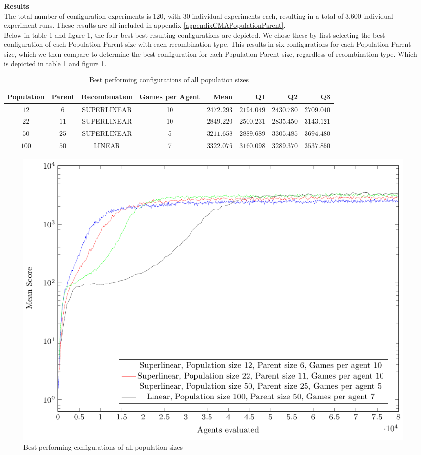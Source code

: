 \textbf{Results}\\
The total number of configuration experiments is 120, with 30 individual experiments each,
resulting in a total of 3.600 individual experiment runs. These results are all included in 
appendix \ref{appendixCMAPopulationParent}.\\
Below in table \ref{CMABestConfigTable} and figure \ref{CMABestConfigPlot}, the four best
best resulting configurations are depicted. We chose these by first selecting the best 
configuration of each Population-Parent size with each recombination type. This results in six
configurations for each Population-Parent size, which we then compare to determine the best
configuration for each Population-Parent size, regardless of recombination type. Which is depicted in table \ref{CMABestConfigTable} and figure \ref{CMABestConfigPlot}.

\begin{table}[H]
\centering
\small
\begin{tabular}{c c c c r r r r}
Population & Parent & Recombination & Games per Agent & Mean & Q1 & Q2 & Q3\\
\hline
$12$ & $6$  & SUPERLINEAR & 10 & $2472.293$ & $2194.049$ & $2430.780$ & $2709.040$\\
$22$ & $11$ & SUPERLINEAR & 10 & $2849.220$ & $2500.231$ & $2835.450$ & $3143.121$\\
$50$ & $25$ & SUPERLINEAR & 5  & $3211.658$ & $2889.689$ & $3305.485$ & $3694.480$\\
$100$ & $50$ & LINEAR     & 7  & $3322.076$ & $3160.098$ & $3289.370$ & $3537.850$
\end{tabular}
\caption{Best performing configurations of all population sizes \label{CMABestConfigTable}}
\end{table}

\begin{figure}[H]
\centering
\includegraphics[scale=1]{data/cma_population_offspring/bestofall_population/PlotFile.pdf}
\caption{Best performing configurations of all population sizes \label{CMABestConfigPlot}}
\end{figure}

